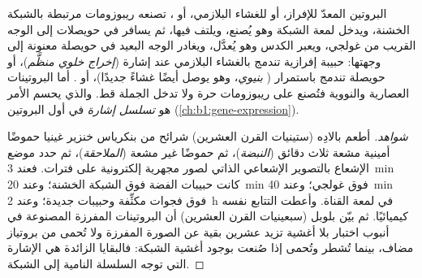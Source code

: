 \begin{proposition}\label{prop:b1:eukaryotic-cell:secretory}
البروتين المعدّ للإفراز، أو للغشاء البلازمي، أو ، تصنعه
ريبوزومات مرتبطة بالشبكة الخشنة، ويدخل لمعة الشبكة وهو يُصنع، ويلتف
فيها، ثم يسافر في حويصلات إلى الوجه القريب من غولجي، ويعبر الكدس
وهو يُعدَّل، ويغادر الوجه البعيد في حويصلة معنونة إلى وجهتها:
حبيبة إفرازية تندمج بالغشاء البلازمي عند إشارة (\emph{إخراج خلوي
منظَّم})، أو حويصلة تندمج باستمرار (
\emph{بنيوي}، وهو يوصل أيضًا غشاءً جديدًا)، أو . أما
البروتينات العصارية والنووية فتُصنع على ريبوزومات حرة ولا تدخل
الجملة قط. والذي يحسم الأمر هو \emph{تسلسل إشارة}
في أول البروتين (\cref{ch:b1:gene-expression}).
\end{proposition}
\begin{proof}[شواهد]
أطعم بالادِه (ستينيات القرن العشرين) شرائح من بنكرياس خنزير غينيا
حموضًا أمينية مشعة ثلاث دقائق (\emph{النبضة})، ثم حموضًا غير مشعة
(\emph{الملاحقة})، ثم حدد موضع الإشعاع بالتصوير الإشعاعي الذاتي
لصور مجهرية إلكترونية على فترات. فعند \qty{3}{min} كانت حبيبات
الفضة فوق الشبكة الخشنة؛ وعند \qty{20}{min} فوق غولجي؛ وعند
\qty{40}{min} فوق فجوات مكثِّفة وحبيبات جديدة؛ وعند \qty{2}{h} في
لمعة القناة. وأعطت  التتابع نفسه كيميائيًا. ثم بيّن
بلوبل (سبعينيات القرن العشرين) أن البروتينات المفرزة المصنوعة في
أنبوب اختبار بلا أغشية تزيد عشرين بقية عن الصورة المفرزة ولا تُحمى من
بروتياز مضاف، بينما تُشطر وتُحمى إذا صُنعت بوجود أغشية الشبكة:
فالبقايا الزائدة هي الإشارة التي توجه السلسلة النامية إلى الشبكة.
\end{proof}

